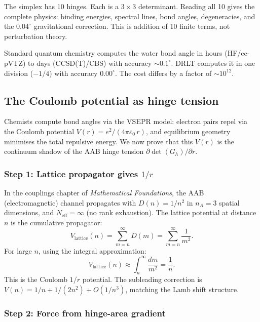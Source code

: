 \documentclass[12pt]{article}
\theoremstyle{remark}
\theoremstyle{definition}
\begin{document}
The simplex has 10 hinges. Each is a $3 \times 3$ determinant. Reading all 10 gives the complete physics: binding energies, spectral lines, bond angles, degeneracies, and the $0.04^\circ$ gravitational correction. This is addition of 10 finite terms, not perturbation theory.

Standard quantum chemistry computes the water bond angle in hours (HF/cc-pVTZ) to days (CCSD(T)/CBS) with accuracy $\sim 0.1^\circ$. DRLT computes it in one division ($-1/4$) with accuracy $0.00^\circ$. The cost differs by a factor of $\sim 10^{12}$.

\subsection{The Coulomb potential as hinge tension}
\label{sec:coulomb_hinge}

Chemists compute bond angles via the VSEPR model: electron pairs repel via the Coulomb potential $V(r) = e^2/(4\pi\varepsilon_0\,r)$, and equilibrium geometry minimises the total repulsive energy.  We now prove that this $V(r)$ is the continuum shadow of the AAB hinge tension $\partial\det(G_h)/\partial r$.

\subsubsection{Step 1: Lattice propagator gives $1/r$}

In the couplings chapter of \textit{Mathematical Foundations}, the AAB (electromagnetic) channel propagates with $D(n) = 1/n^2$ in $n_A = 3$ spatial dimensions, and $N_\text{eff} = \infty$ (no rank exhaustion).  The lattice potential at distance $n$ is the cumulative propagator:
\begin{equation}
V_\text{lattice}(n) = \sum_{m=n}^{\infty} D(m) = \sum_{m=n}^{\infty}\frac{1}{m^2}.
\end{equation}
For large $n$, using the integral approximation:
\begin{equation}
V_\text{lattice}(n) \approx \int_n^\infty \frac{dm}{m^2} = \frac{1}{n}.
\end{equation}
This is the Coulomb $1/r$ potential.  The subleading correction is $V(n) = 1/n + 1/(2n^2) + O(1/n^3)$, matching the Lamb shift structure.

\subsubsection{Step 2: Force from hinge-area gradient}
\end{document}
